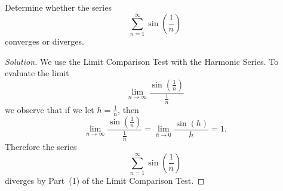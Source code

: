 \documentclass[12pt]{amsart}
\begin{document}
\begin{thm}
  Determine whether the series
  \[\sum_{n = 1}^\infty \sin\left(\frac{1}{n}\right)\]
  converges or diverges.
\end{thm}

\begin{proof}[Solution]
  We use the Limit Comparison Test with the Harmonic Series.
  To evaluate the limit
  \[\lim_{n \to \infty} \frac{\sin\left(\frac{1}{n}\right)}{\frac{1}{n}}\]
  we observe that if we let \(h = \frac{1}{n}\), then
  \[\lim_{n \to \infty} \frac{\sin\left(\frac{1}{n}\right)}{\frac{1}{n}} = \lim_{h \to 0} \frac{\sin(h)}{h} = 1.\]
  Therefore the series
  \[\sum_{n = 1}^\infty \sin\left(\frac{1}{n}\right)\]
  diverges by Part~(1) of the Limit Comparison Test.
\end{proof}
\end{document}
